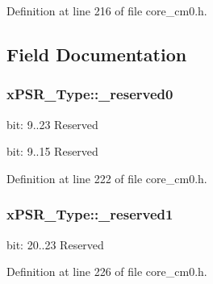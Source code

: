 Definition at line 216 of file core\-\_\-cm0.\-h.



\subsection{Field Documentation}
\hypertarget{unionx_p_s_r___type_af438e0f407357e914a70b5bd4d6a97c5}{
\subsubsection[{\-\_\-reserved0}]{ x\-P\-S\-R\-\_\-\-Type\-::\-\_\-reserved0}}\label{unionx_p_s_r___type_af438e0f407357e914a70b5bd4d6a97c5}
bit\-: 9..23 Reserved

bit\-: 9..15 Reserved 

Definition at line 222 of file core\-\_\-cm0.\-h.

\hypertarget{unionx_p_s_r___type_a790056bb6f20ea16cecc784b0dd19ad6}{
\subsubsection[{\-\_\-reserved1}]{ x\-P\-S\-R\-\_\-\-Type\-::\-\_\-reserved1}}\label{unionx_p_s_r___type_a790056bb6f20ea16cecc784b0dd19ad6}
bit\-: 20..23 Reserved 

Definition at line 226 of file core\-\_\-cm0.\-h.

